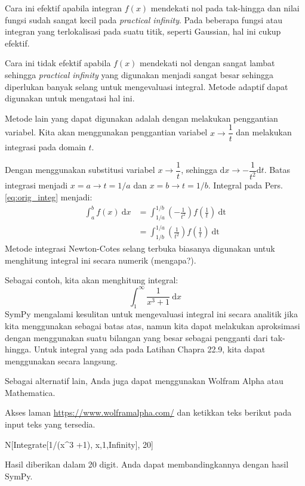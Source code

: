 Cara ini efektif apabila integran $f(x)$ mendekati nol pada tak-hingga dan nilai fungsi
sudah sangat kecil pada \textit{practical infinity}.
Pada beberapa fungsi atau integran yang terlokalisasi pada suatu titik, seperti Gaussian,
hal ini cukup efektif.

Cara ini tidak efektif apabila $f(x)$ mendekati nol dengan sangat lambat sehingga
\textit{practical infinity} yang digunakan menjadi sangat besar sehingga diperlukan
banyak selang untuk mengevaluasi integral. Metode adaptif dapat digunakan untuk
mengatasi hal ini.

Metode lain yang dapat digunakan adalah dengan melakukan penggantian variabel.
Kita akan menggunakan penggantian variabel $x \rightarrow \dfrac{1}{t}$ dan melakukan
integrasi pada domain $t$.

Dengan menggunakan substitusi variabel $x \rightarrow \dfrac{1}{t}$, sehingga
$\mathrm{d}x \rightarrow -\dfrac{1}{t^2} \mathrm{d}t$. Batas integrasi menjadi
$x=a \rightarrow t=1/a$ dan $x=b \rightarrow t=1/b$.
Integral pada Pers. \eqref{eq:orig_integ} menjadi:
\begin{align*}
\int_{a}^{b} f(x)\ \mathrm{d}x & = \int_{1/a}^{1/b}
\left( -\frac{1}{t^2} \right) f\left(\frac{1}{t}\right)\ \mathrm{dt} \\
& = \int_{1/b}^{1/a}
\left( \frac{1}{t^2} \right) f\left(\frac{1}{t}\right)\ \mathrm{dt}
\end{align*}
Metode integrasi Newton-Cotes selang terbuka biasanya digunakan
untuk menghitung integral ini secara numerik (mengapa?).

Sebagai contoh, kita akan menghitung integral:
\begin{equation}
\int_{1}^{\infty} \frac{1}{x^3 + 1}\ \mathrm{d}x
\end{equation}
SymPy mengalami kesulitan untuk mengevaluasi integral ini secara analitik
jika kita menggunakan  sebagai batas atas, namun kita
dapat melakukan aproksimasi dengan menggunakan suatu bilangan yang besar
sebagai pengganti dari tak-hingga. Untuk integral yang ada pada
Latihan Chapra 22.9, kita dapat menggunakan  secara
langsung.

Sebagai alternatif lain, Anda juga dapat menggunakan Wolfram Alpha
atau Mathematica.

Akses laman
{\scriptsize\url{https://www.wolframalpha.com/}} dan ketikkan teks
berikut pada input teks yang tersedia.
\begin{textcode}
N[Integrate[1/(x^3 +1), {x,1,Infinity}], 20]
\end{textcode}
Hasil diberikan dalam 20 digit. Anda dapat membandingkannya dengan hasil SymPy.

